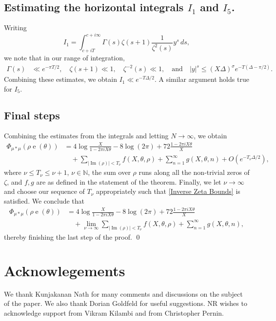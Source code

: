 \documentclass[11pt]{amsart}
\numberwithin{equation}{section}
\numberwithin{figure}{section}
\theoremstyle{definition}
\newcommand{\e}{\operatorname{e}}
\begin{document}
\subsection*{Estimating the horizontal integrals $I_1$ and $I_5$.} Writing
\[
I_1 = \int_{c+iT}^{c+i\infty} \Gamma(s) \zeta(s+1) \frac{1}{\zeta^2(s)} y^s \,ds,
\]
we note that in our range of integration,
\begin{align*}
    \Gamma(s) &\ll e^{-\pi T/2}, \quad \zeta(s+1) \ll 1, \quad \zeta^{-2}(s) \ll 1, \quad \textrm{and} \quad \lvert y \rvert^s \leqslant(X\Delta)^{\sigma}e^{-T(\Delta-\pi/2)}. 
\end{align*}
Combining these estimates, we obtain $I_1 \ll e^{- T\Delta /2}.$ A similar argument holds true for $I_5$.
\subsection*{Final steps} Combining the estimates from the integrals and letting $N \to \infty$, we obtain
\begin{align}
\Phi_{\mu * \mu}(\rho \e(\theta)) &= 4 \log \frac{X}{1-2\pi i X\theta} - 8 \log(2 \pi) + 72 \frac{1-2\pi i X\theta}{X}\nonumber \\
& \quad +\sum_{|\operatorname{Im}(\rho)| < T_\nu}  f(X,\theta,\rho)  +\sum_{n=1}^{\infty} g(X,\theta,n) +O(e^{- T_\nu\Delta /2}),  \end{align}
where $\nu \leqslant T_\nu \leqslant \nu+1$, $\nu \in \mathbb{N}$, the sum over $\rho$ runs along all the non-trivial zeros of $\zeta$, and $f,g$ are as defined in the statement of the theorem. Finally, we let $ \nu \to \infty$ and choose our sequence of $T_{\nu}$ appropriately  such that \eqref{Inverse Zeta Bounds} is satisfied. We conclude that  
\begin{align*} 
    \Phi_{\mu * \mu}(\rho \e(\theta)) &= 4 \log \frac{X}{1-2\pi i X\theta} - 8 \log(2 \pi) + 72 \frac{1-2\pi i X\theta}{X}\nonumber \\
    & \quad + \lim_{\nu \to \infty} \sum_{|\operatorname{Im}(\rho)| < T_\nu}  f(X,\theta,\rho)  +\sum_{n=1}^{\infty} g(X,\theta,n),
\end{align*}
thereby finishing the last step of the proof.
\qed


\section{Acknowlegements}
We thank Kunjakanan Nath for many comments and discussions on the subject of the paper. We also thank Dorian Goldfeld for useful suggestions. NR wishes to acknowledge support from Vikram Kilambi and from Christopher Pernin.
\end{document}
